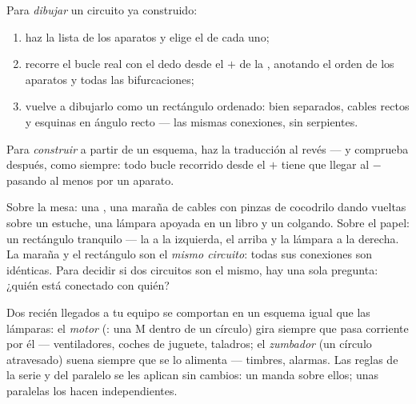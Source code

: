 \begin{method}\label{met:g6:circuits-and-safety:translate}
Para \emph{dibujar} un circuito ya construido:
\begin{enumerate}
  \item haz la lista de los aparatos y elige el  de cada
        uno;
  \item recorre el bucle real con el dedo desde el $+$ de la
        , anotando el orden de los aparatos y todas las
        bifurcaciones;
  \item vuelve a dibujarlo como un rectángulo ordenado:
         bien separados, cables rectos y esquinas en
        ángulo recto --- las mismas conexiones, sin serpientes.
\end{enumerate}
Para \emph{construir} a partir de un esquema, haz la traducción al
revés --- y comprueba después, como siempre: todo bucle recorrido
desde el $+$ tiene que llegar al $-$ pasando al menos por un aparato.
\end{method}

\begin{example}\label{ex:g6:circuits-and-safety:portraits}
Sobre la mesa: una , una maraña de cables con pinzas de cocodrilo
dando vueltas sobre un estuche, una lámpara apoyada en un libro y un
 colgando. Sobre el papel: un rectángulo tranquilo ---
la  a la izquierda, el  arriba y la lámpara a la
derecha. La maraña y el rectángulo son el \emph{mismo circuito}: todas
sus conexiones son idénticas. Para decidir si dos circuitos son el
mismo, hay una sola pregunta: ¿quién está conectado con quién?
\end{example}

\begin{example}\label{ex:g6:circuits-and-safety:motor}
Dos recién llegados a tu equipo se comportan en un esquema igual que
las lámparas: el \emph{motor} (: una M dentro
de un círculo) gira siempre que pasa corriente por él --- ventiladores,
coches de juguete, taladros; el \emph{zumbador} (un
círculo atravesado) suena siempre que se lo alimenta --- timbres,
alarmas. Las reglas de la serie y del paralelo se les aplican sin
cambios: un   manda sobre ellos; unas
 paralelas los hacen independientes.
\end{example}

